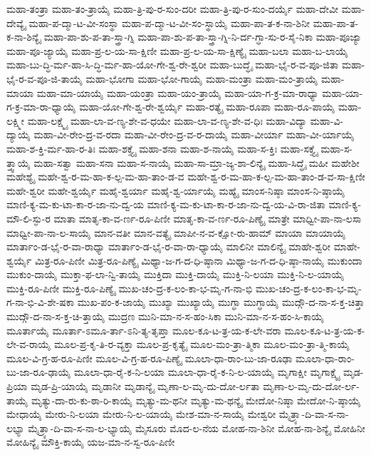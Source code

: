 {ಮಹಾ-ತಂತ್ರಾ
ಮಹಾ-ತಂ-ತ್ರಾಯೈ
ಮಹಾ-ತ್ರಿ-ಪು-ರ-ಸುಂ-ದರೀ
ಮಹಾ-ತ್ರಿ-ಪು-ರ-ಸುಂ-ದರ್ಯೈ
ಮಹಾ-ದೇವೀ
ಮಹಾ-ದೇವ್ಯೈ
ಮಹಾ-ಪ-ದ್ಮಾ-ಟ-ವೀ-ಸಂಸ್ಥಾ
ಮಹಾ-ಪ-ದ್ಮಾ-ಟ-ವೀ-ಸಂ-ಸ್ಥಾಯೈ
ಮಹಾ-ಪಾ-ತ-ಕ-ನಾ-ಶಿನೀ
ಮಹಾ-ಪಾ-ತ-ಕ-ನಾ-ಶಿನ್ಯೈ
ಮಹಾ-ಪಾ-ಶು-ಪ-ತಾ-ಸ್ತ್ರಾ-ಗ್ನಿ
ಮಹಾ-ಪಾ-ಶು-ಪ-ತಾ-ಸ್ತ್ರಾ-ಗ್ನಿ-ನಿ-ರ್ದ-ಗ್ಧಾ-ಸು-ರ-ಸೈ-ನಿಕಾ
ಮಹಾ-ಪೂಜ್ಯಾ
ಮಹಾ-ಪೂ-ಜ್ಯಾಯೈ
ಮಹಾ-ಪ್ರ-ಲ-ಯ-ಸಾ-ಕ್ಷಿಣೀ
ಮಹಾ-ಪ್ರ-ಲ-ಯ-ಸಾ-ಕ್ಷಿಣ್ಯೈ
ಮಹಾ-ಬಲಾ
ಮಹಾ-ಬ-ಲಾಯೈ
ಮಹಾ-ಬು-ದ್ಧಿ-ರ್ಮ-ಹಾ-ಸಿ-ದ್ಧಿ-ರ್ಮ-ಹಾ-ಯೋ-ಗೇ-ಶ್ವ-ರೇ-ಶ್ವರೀ
ಮಹಾ-ಬುದ್ಧೈ
ಮಹಾ-ಭೈ-ರ-ವ-ಪೂ-ಜಿತಾ
ಮಹಾ-ಭೈ-ರ-ವ-ಪೂ-ಜಿ-ತಾಯೈ
ಮಹಾ-ಭೋಗಾ
ಮಹಾ-ಭೋ-ಗಾಯೈ
ಮಹಾ-ಮಂತ್ರಾ
ಮಹಾ-ಮಂ-ತ್ರಾಯೈ
ಮಹಾ-ಮಾಯಾ
ಮಹಾ-ಮಾ-ಯಾಯೈ
ಮಹಾ-ಯಂತ್ರಾ
ಮಹಾ-ಯಂ-ತ್ರಾಯೈ
ಮಹಾ-ಯಾ-ಗ-ಕ್ರ-ಮಾ-ರಾಧ್ಯಾ
ಮಹಾ-ಯಾ-ಗ-ಕ್ರ-ಮಾ-ರಾ-ಧ್ಯಾಯೈ
ಮಹಾ-ಯೋ-ಗೇ-ಶ್ವ-ರೇ-ಶ್ವರ್ಯೈ
ಮಹಾ-ರತ್ಯೈ
ಮಹಾ-ರೂಪಾ
ಮಹಾ-ರೂ-ಪಾಯೈ
ಮಹಾ-ಲಕ್ಷ್ಮೀ
ಮಹಾ-ಲಕ್ಷ್ಮೈ
ಮಹಾ-ಲಾ-ವ-ಣ್ಯ-ಶೇ-ವ-ಧಯೇ
ಮಹಾ-ಲಾ-ವ-ಣ್ಯ-ಶೇ-ವ-ಧಿಃ
ಮಹಾ-ವಿದ್ಯಾ
ಮಹಾ-ವಿ-ದ್ಯಾಯೈ
ಮಹಾ-ವೀ-ರೇಂ-ದ್ರ-ವ-ರದಾ
ಮಹಾ-ವೀ-ರೇಂ-ದ್ರ-ವ-ರ-ದಾಯೈ
ಮಹಾ-ವೀರ್ಯಾ
ಮಹಾ-ವೀ-ರ್ಯಾಯೈ
ಮಹಾ-ಶ-ಕ್ತಿ-ರ್ಮ-ಹಾ-ರ-ತಿಃ
ಮಹಾ-ಶಕ್ತ್ಯೈ
ಮಹಾ-ಶನಾ
ಮಹಾ-ಶ-ನಾಯೈ
ಮಹಾ-ಸ-ಕ್ತಿಃ
ಮಹಾ-ಸಕ್ತ್ಯೈ
ಮಹಾ-ಸ-ತ್ತ್ವಾಯೈ
ಮಹಾ-ಸತ್ವಾ
ಮಹಾ-ಸನಾ
ಮಹಾ-ಸ-ನಾಯೈ
ಮಹಾ-ಸಾ-ಮ್ರಾ-ಜ್ಯ-ಶಾ-ಲಿನ್ಯೈ
ಮಹಾ-ಸಿದ್ಧೈ
ಮಹೀ
ಮಹೇಶೀ
ಮಹೇಶ್ಯೈ
ಮಹೇ-ಶ್ವ-ರ-ಮ-ಹಾ-ಕ-ಲ್ಪ-ಮ-ಹಾ-ತಾಂ-ಡ-ವ
ಮಹೇ-ಶ್ವ-ರ-ಮ-ಹಾ-ಕ-ಲ್ಪ-ಮ-ಹಾ-ತಾಂ-ಡ-ವ-ಸಾ-ಕ್ಷಿಣೀ
ಮಹೇ-ಶ್ವರೀ
ಮಹೇ-ಶ್ವರ್ಯೈ
ಮಹೈ-ಶ್ವರ್ಯಾ
ಮಹೈ-ಶ್ವ-ರ್ಯಾಯೈ
ಮಹ್ಯೈ
ಮಾಂಸ-ನಿಷ್ಠಾ
ಮಾಂಸ-ನಿ-ಷ್ಠಾಯೈ
ಮಾಣಿ-ಕ್ಯ-ಮ-ಕು-ಟಾ-ಕಾ-ರ-ಜಾ-ನು-ದ್ವ-ಯ
ಮಾಣಿ-ಕ್ಯ-ಮ-ಕು-ಟಾ-ಕಾ-ರ-ಜಾ-ನು-ದ್ವ-ಯ-ವಿ-ರಾ-ಜಿತಾ
ಮಾಣಿ-ಕ್ಯ-ಮೌ-ಲಿ-ಸ್ಫು-ರ
ಮಾತಾ
ಮಾತೃ-ಕಾ-ವ-ರ್ಣ-ರೂ-ಪಿಣೀ
ಮಾತೃ-ಕಾ-ವ-ರ್ಣ-ರೂ-ಪಿಣ್ಯೈ
ಮಾತ್ರೇ
ಮಾಧ್ವೀ-ಪಾ-ನಾ-ಲಸಾ
ಮಾಧ್ವೀ-ಪಾ-ನಾ-ಲ-ಸಾಯೈ
ಮಾನ-ವತೀ
ಮಾನ-ವತ್ಯೈ
ಮಾಪೀ-ನ-ವ-ಕ್ಷೋ-ರು-ಹಾಮ್
ಮಾಯಾ
ಮಾಯಾಯೈ
ಮಾರ್ತಾಂ-ಡ-ಭೈ-ರ-ವಾ-ರಾಧ್ಯಾ
ಮಾರ್ತಾಂ-ಡ-ಭೈ-ರ-ವಾ-ರಾ-ಧ್ಯಾಯೈ
ಮಾಲಿನೀ
ಮಾಲಿನ್ಯೈ
ಮಾಹೇ-ಶ್ವರೀ
ಮಾಹೇ-ಶ್ವರ್ಯೈ
ಮಿತ್ರ-ರೂ-ಪಿಣೀ
ಮಿತ್ರ-ರೂ-ಪಿಣ್ಯೈ
ಮಿಥ್ಯಾ-ಜ-ಗ-ದ-ಧಿ-ಷ್ಠಾನಾ
ಮಿಥ್ಯಾ-ಜ-ಗ-ದ-ಧಿ-ಷ್ಠಾ-ನಾಯೈ
ಮುಕುಂದಾ
ಮುಕುಂ-ದಾಯೈ
ಮುಕ್ತಾ-ಫ-ಲಾ-ನ್ವಿ-ತಾಯೈ
ಮುಕ್ತಿದಾ
ಮುಕ್ತಿ-ದಾಯೈ
ಮುಕ್ತಿ-ನಿ-ಲಯಾ
ಮುಕ್ತಿ-ನಿ-ಲ-ಯಾಯೈ
ಮುಕ್ತಿ-ರೂ-ಪಿಣೀ
ಮುಕ್ತಿ-ರೂ-ಪಿಣ್ಯೈ
ಮುಖ-ಚಂ-ದ್ರ-ಕ-ಲಂ-ಕಾ-ಭ-ಮೃ-ಗ-ನಾ-ಭಿ
ಮುಖ-ಚಂ-ದ್ರ-ಕ-ಲಂ-ಕಾ-ಭ-ಮೃ-ಗ-ನಾ-ಭಿ-ವಿ-ಶೇ-ಷಕಾ
ಮುಖ-ಪಂ-ಕ-ಜಾಯೈ
ಮುಖ್ಯಾ
ಮುಖ್ಯಾಯೈ
ಮುಗ್ಧಾ
ಮುಗ್ಧಾಯೈ
ಮುದ್ಗೌ-ದ-ನಾ-ಸ-ಕ್ತ-ಚಿತ್ತಾ
ಮುದ್ಗೌ-ದ-ನಾ-ಸ-ಕ್ತ-ಚಿ-ತ್ತಾಯೈ
ಮುದ್ರಣ
ಮುನಿ-ಮಾ-ನ-ಸ-ಹಂ-ಸಿಕಾ
ಮುನಿ-ಮಾ-ನ-ಸ-ಹಂ-ಸಿ-ಕಾಯೈ
ಮೂರ್ತಾಯೈ
ಮೂರ್ತಾ-ಽಮೂ-ರ್ತಾ-ಽನಿ-ತ್ಯ-ತೃಪ್ತಾ
ಮೂಲ-ಕೂ-ಟ-ತ್ರ-ಯ-ಕ-ಲೇ-ವರಾ
ಮೂಲ-ಕೂ-ಟ-ತ್ರ-ಯ-ಕ-ಲೇ-ವ-ರಾಯೈ
ಮೂಲ-ಪ್ರ-ಕೃ-ತಿ-ರ-ವ್ಯಕ್ತಾ
ಮೂಲ-ಪ್ರ-ಕೃತ್ಯೈ
ಮೂಲ-ಮಂ-ತ್ರಾ-ತ್ಮಿಕಾ
ಮೂಲ-ಮಂ-ತ್ರಾ-ತ್ಮಿ-ಕಾಯೈ
ಮೂಲ-ವಿ-ಗ್ರ-ಹ-ರೂ-ಪಿಣೀ
ಮೂಲ-ವಿ-ಗ್ರ-ಹ-ರೂ-ಪಿಣ್ಯೈ
ಮೂಲಾ-ಧಾ-ರಾಂ-ಬು-ಜಾ-ರೂಢಾ
ಮೂಲಾ-ಧಾ-ರಾಂ-ಬು-ಜಾ-ರೂ-ಢಾಯೈ
ಮೂಲಾ-ಧಾ-ರೈ-ಕ-ನಿ-ಲಯಾ
ಮೂಲಾ-ಧಾ-ರೈ-ಕ-ನಿ-ಲ-ಯಾಯೈ
ಮೃಗಾಕ್ಷೀ
ಮೃಗಾಕ್ಷ್ಯೈ
ಮೃಡ-ಪ್ರಿಯಾ
ಮೃಡ-ಪ್ರಿ-ಯಾಯೈ
ಮೃಡಾನೀ
ಮೃಡಾನ್ಯೈ
ಮೃಣಾ-ಲ-ಮೃ-ದು-ದೋ-ರ್ಲತಾ
ಮೃಣಾ-ಲ-ಮೃ-ದು-ದೋ-ರ್ಲ-ತಾಯೈ
ಮೃತ್ಯು-ದಾ-ರು-ಕು-ಠಾ-ರಿ-ಕಾಯೈ
ಮೃತ್ಯು-ಮ-ಥನೀ
ಮೃತ್ಯು-ಮ-ಥನ್ಯೈ
ಮೇದೋ-ನಿಷ್ಠಾ
ಮೇದೋ-ನಿ-ಷ್ಠಾಯೈ
ಮೇಧಾಯೈ
ಮೇರು-ನಿ-ಲಯಾ
ಮೇರು-ನಿ-ಲ-ಯಾಯೈ
ಮೇಶ-ಮಾ-ನ-ಸಾಯೈ
ಮೇಶ್ವರೀ
ಮೈತ್ರ್ಯಾ-ದಿ-ವಾ-ಸ-ನಾ-ಲಭ್ಯಾ
ಮೈತ್ರ್ಯಾ-ದಿ-ವಾ-ಸ-ನಾ-ಲ-ಭ್ಯಾಯೈ
ಮೈಸೂರು
ಮೊದ-ಲ-ನೆಯ
ಮೋಹ-ನಾ-ಶಿನೀ
ಮೋಹ-ನಾ-ಶಿನ್ಯೈ
ಮೋಹಿನೀ
ಮೋಹಿನ್ಯೈ
ಮೌಕ್ತಿ-ಕಾಯೈ
ಯಜ-ಮಾ-ನ-ಸ್ವ-ರೂ-ಪಿಣೀ
}
